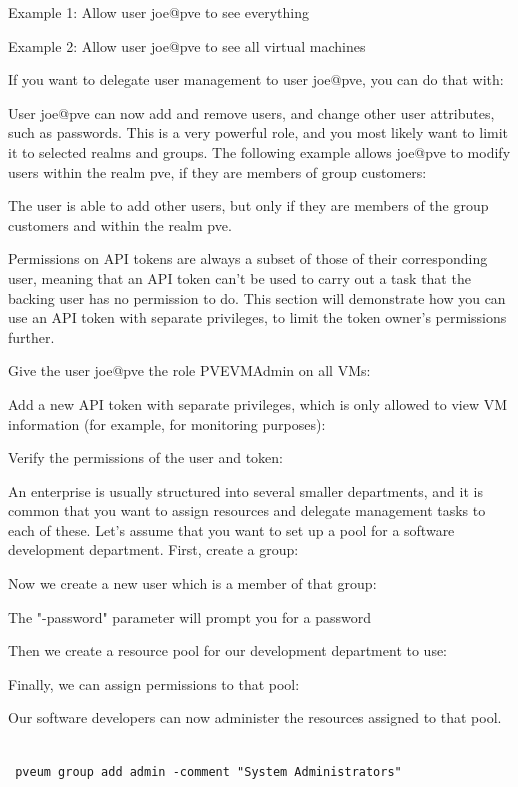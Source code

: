 Example 1: Allow user joe@pve to see everything

Example 2: Allow user joe@pve to see all virtual machines

If you want to delegate user management to user joe@pve, you can do that with:

User joe@pve can now add and remove users, and change other user attributes, such as passwords. This is a very powerful role, and you most likely want to limit it to selected realms and groups. The following example allows joe@pve to modify users within the realm pve, if they are members of group customers:

The user is able to add other users, but only if they are members of the group customers and within the realm pve.

Permissions on API tokens are always a subset of those of their corresponding user, meaning that an API token can’t be used to carry out a task that the backing user has no permission to do. This section will demonstrate how you can use an API token with separate privileges, to limit the token owner’s permissions further.

Give the user joe@pve the role PVEVMAdmin on all VMs:

Add a new API token with separate privileges, which is only allowed to view VM information (for example, for monitoring purposes):

Verify the permissions of the user and token:

An enterprise is usually structured into several smaller departments, and it is common that you want to assign resources and delegate management tasks to each of these. Let’s assume that you want to set up a pool for a software development department. First, create a group:

Now we create a new user which is a member of that group:

The "-password" parameter will prompt you for a password

Then we create a resource pool for our development department to use:

Finally, we can assign permissions to that pool:

Our software developers can now administer the resources assigned to that pool.

\begin{lstlisting}

 pveum group add admin -comment "System Administrators"

\end{lstlisting}


